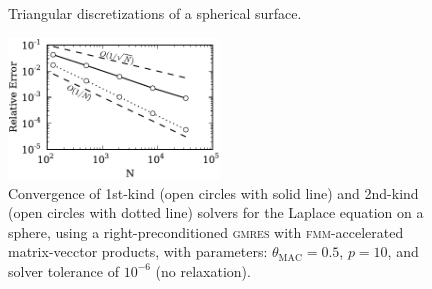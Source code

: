 \documentclass[final,leqno,]{siamltex1213}
\newcommand{\fmm}{\textsc{fmm}\xspace}
\newcommand{\gmres}{\textsc{gmres}\xspace}
\begin{document}
\begin{figure}[ht]
\begin{center}
	\qquad
	\caption{Triangular discretizations of a spherical surface.}
	\label{fig:glob_spheres}
\end{center}
\end{figure}
%
\begin{figure}[t]
\begin{center}
	\includegraphics[natwidth=3in,natheight=2in,width=0.5\textwidth]{LaplaceConvergence.pdf}
	\caption{Convergence of 1st-kind (open circles with solid line) and 2nd-kind (open circles with dotted line) solvers for the Laplace equation on a sphere, using a right-preconditioned \gmres with \fmm-accelerated matrix-vecctor products, with parameters: $\theta_{\text{MAC}} = 0.5$, $p=10$, and solver tolerance of $10^{-6}$ (no relaxation).}
	\label{fig:laplaceconvergence}
\end{center}
\end{figure}
\end{document}
